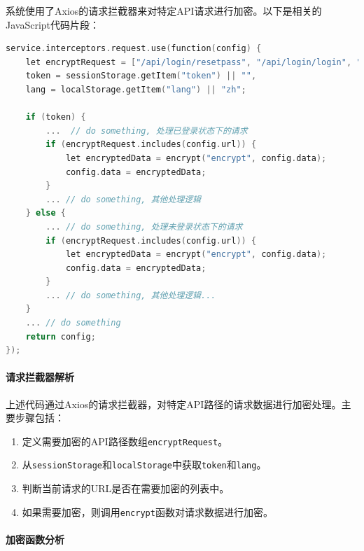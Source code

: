 \documentclass[14pt,a4paper,UTF8,twoside]{article}
\begin{document}
系统使用了Axios的请求拦截器来对特定API请求进行加密。以下是相关的JavaScript代码片段：

\begin{lstlisting}[language=C, caption=请求拦截与加密代码]
service.interceptors.request.use(function(config) {
    let encryptRequest = ["/api/login/resetpass", "/api/login/login", "/api/login/forget", "/api/Seat/confirm", "/api/Seminar/confirm", "/reserve/index/confirm", "/api/Enter/confirm", "/api/Seat/touch_qr_books", "/api/seat/qrcode", "/api/seat/qrcode_not_card", "/api/Study/StudyOrder", "/api/login/updateUserInfo", "/api/seat/xuzuoconfirm"],
    token = sessionStorage.getItem("token") || "",
    lang = localStorage.getItem("lang") || "zh";
    
    if (token) {
        ...  // do something, 处理已登录状态下的请求
        if (encryptRequest.includes(config.url)) {
            let encryptedData = encrypt("encrypt", config.data);
            config.data = encryptedData;
        }
        ... // do something, 其他处理逻辑
    } else {
        ... // do something, 处理未登录状态下的请求
        if (encryptRequest.includes(config.url)) {
            let encryptedData = encrypt("encrypt", config.data);
            config.data = encryptedData;
        }
        ... // do something, 其他处理逻辑...
    }
    ... // do something
    return config;
});
\end{lstlisting}

\paragraph{请求拦截器解析}

上述代码通过Axios的请求拦截器，对特定API路径的请求数据进行加密处理。主要步骤包括：

\begin{enumerate}
    \item 定义需要加密的API路径数组\texttt{encryptRequest}。
    \item 从\texttt{sessionStorage}和\texttt{localStorage}中获取\texttt{token}和\texttt{lang}。
    \item 判断当前请求的URL是否在需要加密的列表中。
    \item 如果需要加密，则调用\texttt{encrypt}函数对请求数据进行加密。
\end{enumerate}

\paragraph{加密函数分析}
\end{document}
